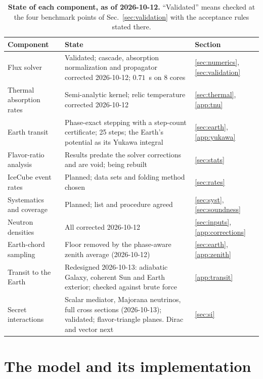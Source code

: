 \documentclass[11pt,a4paper]{article}
\begin{document}
\begin{table}[h]
\centering
\caption{\textbf{State of each component, as of 2026-10-12.} ``Validated'' means checked at the
four benchmark points of Sec.~\ref{sec:validation} with the acceptance rules stated there.}
\label{tab:status}
\small
\begin{tabular}{p{4.2cm}p{7.6cm}l}
\toprule
Component & State & Section \\
\midrule
Flux solver & Validated; cascade, absorption normalization and propagator corrected 2026-10-12; $0.71$~s on 8 cores & \ref{sec:numerics}, \ref{sec:validation} \\
Thermal absorption rates & Semi-analytic kernel; relic temperature corrected 2026-10-12 & \ref{sec:thermal}, \ref{app:tnu} \\
Earth transit & Phase-exact stepping with a step-count certificate; 25 steps; the Earth's potential as its Yukawa integral & \ref{sec:earth}, \ref{app:yukawa} \\
Flavor-ratio analysis & Results predate the solver corrections and are void; being rebuilt & \ref{sec:stats} \\
IceCube event rates & Planned; data sets and folding method chosen & \ref{sec:rates} \\
Systematics and coverage & Planned; list and procedure agreed & \ref{sec:syst}, \ref{sec:soundness} \\
Neutron densities & All corrected 2026-10-12 & \ref{sec:inputs}, \ref{app:corrections} \\
Earth-chord sampling & Floor removed by the phase-aware zenith average (2026-10-12) & \ref{sec:earth}, \ref{app:zenith} \\
Transit to the Earth & Redesigned 2026-10-13: adiabatic Galaxy, coherent Sun and Earth exterior; checked against brute force & \ref{app:transit} \\
Secret interactions & Scalar mediator, Majorana neutrinos, full cross sections (2026-10-13); validated; flavor-triangle planes. Dirac and vector next & \ref{sec:si} \\
\bottomrule
\end{tabular}
\end{table}

\section{The model and its implementation}
\label{sec:model}
\end{document}
